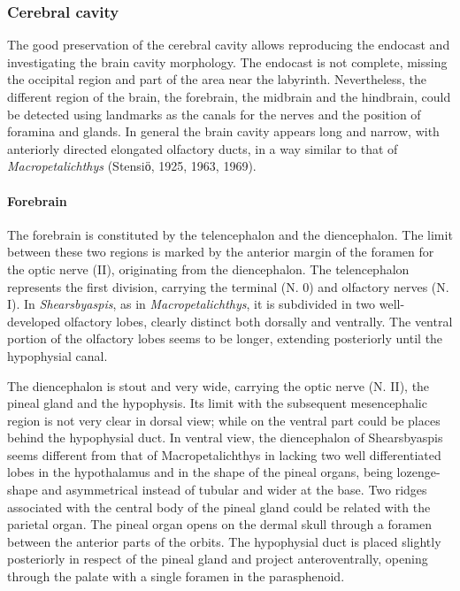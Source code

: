 \documentclass[12pt,letterpaper]{article}
\begin{document}
\subsubsection{Cerebral cavity}

The good preservation of the cerebral cavity allows reproducing the endocast and investigating the brain cavity morphology. The endocast is not complete, missing the occipital region and part of the area near the labyrinth. Nevertheless, the different region of the brain, the forebrain, the midbrain and the hindbrain, could be detected using landmarks as the canals for the nerves and the position of foramina and glands. In general the brain cavity appears long and narrow, with anteriorly directed elongated olfactory ducts, in a way similar to that of \textit{Macropetalichthys} (Stensiӧ, 1925, 1963, 1969). 

\paragraph{Forebrain}

The forebrain is constituted by the telencephalon and the diencephalon. The limit between these two regions is marked by the anterior margin of the foramen for the optic nerve (II), originating from the diencephalon. The telencephalon represents the first division, carrying the terminal (N. 0) and olfactory nerves (N. I). In \textit{Shearsbyaspis}, as in \textit{Macropetalichthys}, it is subdivided in two well-developed olfactory lobes, clearly distinct both dorsally and ventrally. The ventral portion of the olfactory lobes seems to be longer, extending posteriorly until the hypophysial canal. 

The diencephalon is stout and very wide, carrying the optic nerve (N. II), the pineal gland and the hypophysis. Its limit with the subsequent mesencephalic region is not very clear in dorsal view; while on the ventral part could be places behind the hypophysial duct. In ventral view, the diencephalon of Shearsbyaspis seems different from that of Macropetalichthys in lacking two well differentiated lobes in the hypothalamus and in the shape of the pineal organs, being lozenge-shape and asymmetrical instead of tubular and wider at the base. Two ridges associated with the central body of the pineal gland could be related with the parietal organ. The pineal organ opens on the dermal skull through a foramen between the anterior parts of the orbits. The hypophysial duct is placed slightly posteriorly in respect of the pineal gland and project anteroventrally, opening through the palate with a single foramen in the parasphenoid. 
\end{document}
